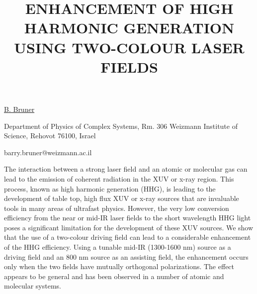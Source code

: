 \title{ENHANCEMENT OF HIGH HARMONIC GENERATION USING TWO-COLOUR LASER FIELDS}

\underline{B. Bruner} 

{\normalsize{\vspace{-4mm}
Department of Physics of Complex Systems, Rm. 306 Weizmann Institute
of Science, Rehovot 76100, Israel

\email barry.bruner@weizmann.ac.il}}

The interaction between a strong laser field and an atomic or molecular gas can lead to the emission of coherent radiation in the XUV or x-ray region.  This process, known as high harmonic generation (HHG), is leading to the development of table top, high flux XUV or x-ray sources that are invaluable tools in many areas of ultrafast physics. However, the very low conversion efficiency from the near or mid-IR laser fields to the short wavelength HHG light poses a significant limitation for the development of these XUV sources.  We show that the use of a two-colour driving field can lead to a considerable enhancement of the HHG efficiency.  Using a tunable mid-IR (1300-1600 nm) source as a driving field and an 800 nm source as an assisting field, the enhancement occurs only when the two fields have mutually orthogonal polarizations.  The effect appears to be general and has been observed in a number of atomic and molecular systems.

\vspace{\baselineskip}
